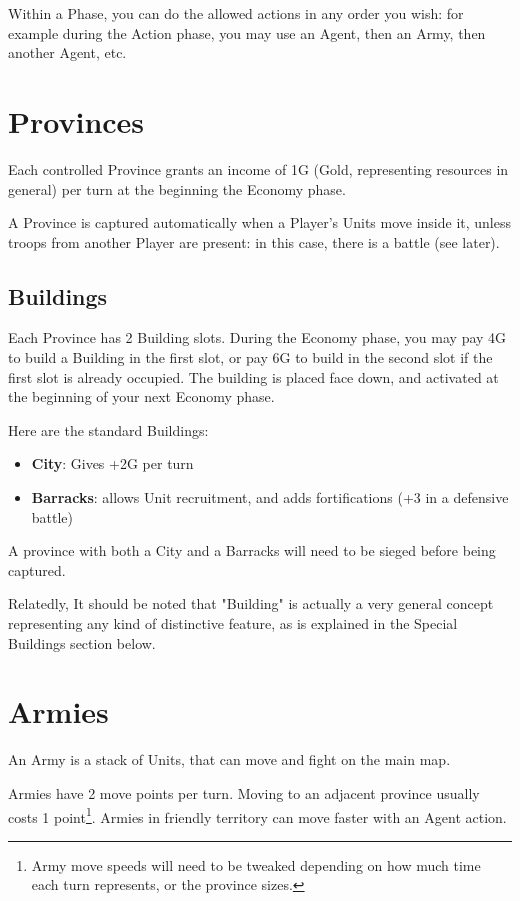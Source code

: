 Within a Phase, you can do the allowed actions in any order you wish: for example during the Action phase, you may use an Agent, then an Army, then another Agent, etc.


\section{Provinces}

Each controlled Province grants an income of 1G (Gold, representing resources in general) per turn at the beginning the Economy phase.

A Province is captured automatically when a Player's Units move inside it, unless troops from another Player are present: in this case, there is a battle (see later).


\subsection{Buildings}


Each Province has 2 Building slots. During the Economy phase, you may pay 4G to build a Building in the first slot, or pay 6G to build in the second slot if the first slot is already occupied. The building is placed face down, and activated at the beginning of your next Economy phase.

Here are the standard Buildings:

\begin{itemize}
    \item \textbf{City}: Gives +2G per turn
    \item \textbf{Barracks}: allows Unit recruitment, and adds fortifications (+3 in a defensive battle)
\end{itemize}

A province with both a City and a Barracks will need to be sieged before being captured.

Relatedly, It should be noted that "Building" is actually a very general concept representing any kind of distinctive feature, as is explained in the Special Buildings section below.

\section{Armies}

An Army is a stack of Units, that can move and fight on the main map.

Armies have 2 move points per turn. Moving to an adjacent province usually costs 1 point\footnote{Army move speeds will need to be tweaked depending on how much time each turn represents, or the province sizes.}. Armies in friendly territory can move faster with an Agent action.



